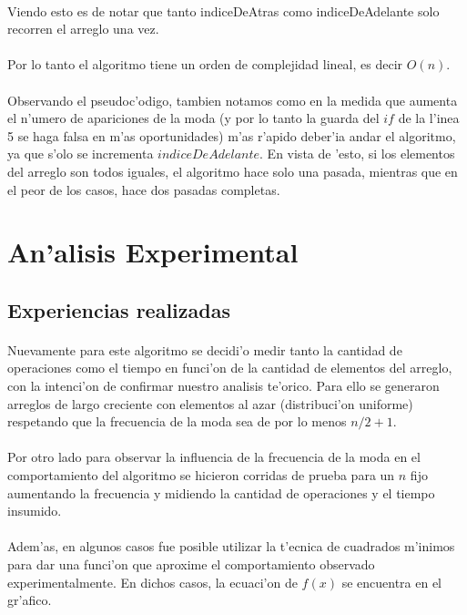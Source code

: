 \paragraph{}
Viendo esto es de notar que tanto indiceDeAtras como indiceDeAdelante solo recorren el arreglo una vez. 
\paragraph{}
Por lo tanto el algoritmo tiene un orden de complejidad lineal, es decir $O(n)$.
\paragraph{}
Observando el pseudoc'odigo, tambien notamos como en la medida que aumenta el n'umero de apariciones de la 
moda (y por lo tanto la guarda del $if$ de la l'inea 5 se haga falsa en m'as oportunidades) m'as r'apido 
deber'ia andar el algoritmo, ya que s'olo se incrementa $indiceDeAdelante$. En vista de 'esto, si los elementos 
del arreglo son todos iguales, el algoritmo hace solo una pasada, mientras que en el peor de los casos, 
hace dos pasadas completas.

\section{An'alisis Experimental}
\subsection{Experiencias realizadas}
\paragraph{}
Nuevamente para este algoritmo se decidi'o medir tanto la cantidad de operaciones como el tiempo en funci'on de la cantidad de 
elementos del arreglo, con la intenci'on de confirmar nuestro analisis te'orico. Para ello se generaron arreglos de largo creciente 
con elementos al azar (distribuci'on uniforme) respetando que la frecuencia de la moda sea de por lo menos $n/2+1$.
\paragraph{}
Por otro lado para observar la influencia de la frecuencia de la moda en el comportamiento del algoritmo se hicieron corridas de prueba
para un $n$ fijo aumentando la frecuencia y midiendo la cantidad de operaciones y el tiempo insumido.
\paragraph{}
Adem'as, en algunos casos fue posible utilizar la t'ecnica de cuadrados m'inimos para dar una funci'on 
que aproxime el comportamiento observado experimentalmente. En dichos casos, la ecuaci'on de $f(x)$ se encuentra en el gr'afico.

